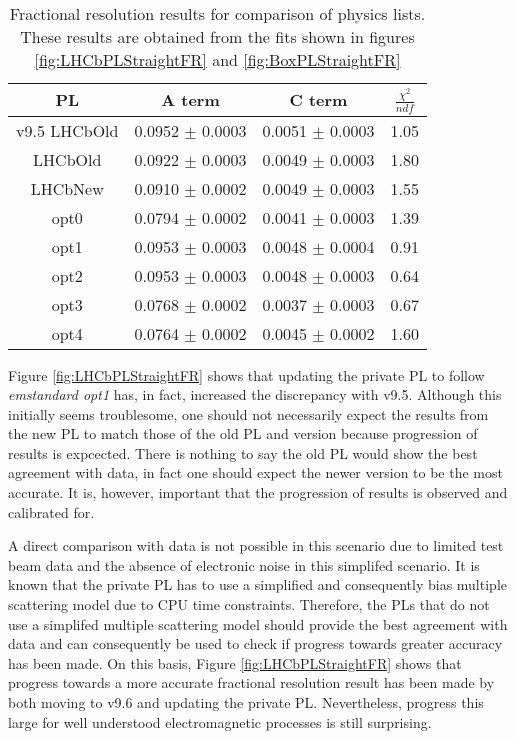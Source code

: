 \begin{table}[h]
  \centering
  \begin{tabular}{|c|c|c|c|}
      \hline
      PL & A term & C term & $\frac{\chi^2}{ndf}$  \\ \hline
      v9.5 LHCbOld & 0.0952 $\pm$ 0.0003 & 0.0051 $\pm$ 0.0003 & 1.05 \\ \hline
      LHCbOld & 0.0922 $\pm$ 0.0003 & 0.0049 $\pm$ 0.0003 & 1.80 \\ \hline 
      LHCbNew & 0.0910 $\pm$ 0.0002 & 0.0049 $\pm$ 0.0003 & 1.55 \\ \hline
      opt0 & 0.0794 $\pm$ 0.0002 & 0.0041 $\pm$ 0.0003 & 1.39 \\ \hline
      opt1 & 0.0953 $\pm$ 0.0003 & 0.0048 $\pm$ 0.0004 & 0.91 \\ \hline
      opt2 & 0.0953 $\pm$ 0.0003 & 0.0048 $\pm$ 0.0003 & 0.64 \\ \hline 
      opt3 & 0.0768 $\pm$ 0.0002 & 0.0037 $\pm$ 0.0003 & 0.67 \\ \hline 
      opt4 & 0.0764 $\pm$ 0.0002 & 0.0045 $\pm$ 0.0002 & 1.60 \\ \hline
  \end{tabular}
  \caption{Fractional resolution results for comparison of \geant physics lists.  These results are obtained from the fits shown in figures \ref{fig:LHCbPLStraightFR} and \ref{fig:BoxPLStraightFR}}
  \label{tab:results}
\end{table}

Figure \ref{fig:LHCbPLStraightFR} shows that updating the \lhcb private PL to follow \textit{emstandard opt1} has, in fact, increased the discrepancy with v9.5.  Although this initially seems troublesome, one should not necessarily expect the results from the new PL to match those of the old PL and \geant version because progression of results is expcected.  There is nothing to say the old PL would show the best agreement with data, in fact one should expect the newer version to be the most accurate.  It is, however, important that the progression of results is observed and calibrated for.

A direct comparison with data is not possible in this scenario due to limited test beam data and the absence of electronic noise in this simplifed scenario.   It is known that the \lhcb private PL has to use a simplified and consequently bias multiple scattering model due to CPU time constraints.  Therefore, the PLs that do not use a simplifed multiple scattering model should provide the best agreement with data and can consequently be used to check if progress towards greater accuracy has been made.  On this basis, Figure \ref{fig:LHCbPLStraightFR} shows that progress towards a more accurate fractional resolution result has been made by both moving to \geant v9.6 and updating the \lhcb private PL. Nevertheless, progress this large for well understood electromagnetic processes is still surprising.

